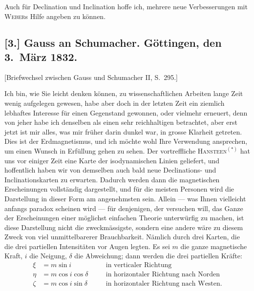 \documentclass[12pt,a4paper]{article}
\begin{document}
Auch f\"ur Declination und Inclination hoffe ich, mehrere neue Verbesserungen mit \textsc{Weber}s Hilfe angeben zu k\"onnen.\dotfill

\subsection*{[3.] Gauss an Schumacher. G\"ottingen, den 3.~M\"arz 1832.}

[Briefwechsel zwischen Gauss und Schumacher II, S.~295.]

\medskip\noindent
Ich bin, wie Sie leicht denken k\"onnen, zu wissenschaftlichen Arbeiten lange Zeit wenig aufgelegen gewesen, habe aber doch in der letzten Zeit ein ziemlich lebhaftes Interesse f\"ur einen Gegenstand gewonnen, oder vielmehr erneuert, denn von jeher habe ich denselben als einen sehr reichhaltigen betrachtet, aber erst jetzt ist mir alles, was mir fr\"uher darin dunkel war, in grosse Klarheit getreten. Dies ist der Erdmagnetismus, und ich m\"ochte wohl Ihre Verwendung ansprechen, um einen Wunsch in Erf\"ullung gehen zu sehen. Der vortreffliche \textsc{Hansteen}$^{(*)}$ hat uns vor einiger Zeit eine Karte der isodynamischen Linien geliefert, und hoffentlich haben wir von demselben auch bald neue Declinations- und Inclinationskarten zu erwarten. Dadurch werden dann die magnetischen Erscheinungen vollst\"andig dargestellt, und f\"ur die meisten Personen wird die Darstellung in dieser Form am angenehmsten sein. Allein --- was Ihnen vielleicht anfangs paradox scheinen wird --- f\"ur denjenigen, der versuchen will, das Ganze der Erscheinungen einer m\"oglichst einfachen Theorie unterw\"urfig zu machen, ist diese Darstellung nicht die zweckm\"assigste, sondern eine andere w\"are zu diesem Zweck von viel unmittelbarerer Brauchbarkeit. N\"amlich durch drei Karten, die die drei partiellen Intensit\"aten vor Augen legten. Es sei $m$ die ganze magnetische Kraft, $i$ die Neigung, $\delta$ die Abweichung; dann werden die drei partiellen Kr\"afte:
\begin{align*}
\xi &= m \sin i \quad &&\text{in verticaler Richtung} \\
\eta &= m \cos i \cos \delta \quad &&\text{in horizontaler Richtung nach Norden} \\
\zeta &= m \cos i \sin \delta \quad &&\text{in horizontaler Richtung nach Westen.}
\end{align*}
\end{document}
